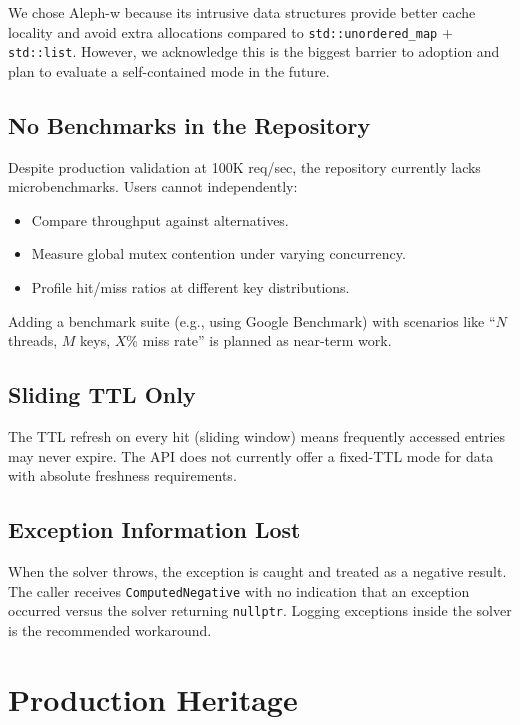 \documentclass[11pt,a4paper]{article}
\begin{document}
We chose Aleph-w because its intrusive data structures provide better
cache locality and avoid extra allocations compared to
\texttt{std::unordered\_map} + \texttt{std::list}.  However, we
acknowledge this is the biggest barrier to adoption and plan to evaluate
a self-contained mode in the future.

\subsection{No Benchmarks in the Repository}

Despite production validation at 100K req/sec, the repository currently
lacks microbenchmarks.  Users cannot independently:

\begin{itemize}
\item Compare throughput against alternatives.
\item Measure global mutex contention under varying concurrency.
\item Profile hit/miss ratios at different key distributions.
\end{itemize}

Adding a benchmark suite (e.g., using Google Benchmark) with scenarios
like ``$N$ threads, $M$ keys, $X$\% miss rate'' is planned as near-term
work.

\subsection{Sliding TTL Only}

The TTL refresh on every hit (sliding window) means frequently accessed
entries may never expire.  The API does not currently offer a fixed-TTL
mode for data with absolute freshness requirements.

\subsection{Exception Information Lost}

When the solver throws, the exception is caught and treated as a
negative result.  The caller receives \texttt{ComputedNegative} with no
indication that an exception occurred versus the solver returning
\texttt{nullptr}.  Logging exceptions inside the solver is the
recommended workaround.

\section{Production Heritage}
\label{sec:production}
\end{document}
